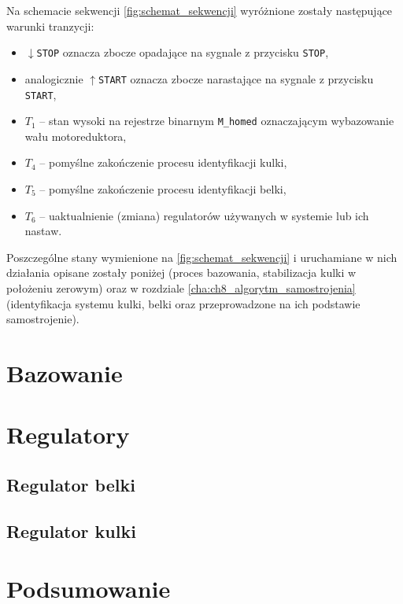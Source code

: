 Na schemacie sekwencji \cref{fig:schemat_sekwencji} wyróżnione zostały następujące warunki tranzycji:
\begin{itemize}
    \item $\downarrow$\texttt{STOP} oznacza zbocze opadające na sygnale z przycisku \texttt{STOP},
    \item analogicznie $\uparrow$\texttt{START} oznacza zbocze narastające na sygnale z przycisku \texttt{START},
    \item $T_1$ -- stan wysoki na rejestrze binarnym \texttt{M\_homed} oznaczającym wybazowanie wału motoreduktora,
    \item $T_4$ -- pomyślne zakończenie procesu identyfikacji kulki,
    \item $T_5$ -- pomyślne zakończenie procesu identyfikacji belki,
    \item $T_6$ -- uaktualnienie (zmiana) regulatorów używanych w systemie lub ich nastaw.
\end{itemize}

Poszczególne stany wymienione na \cref{fig:schemat_sekwencji} i uruchamiane w nich działania opisane zostały poniżej (proces bazowania, stabilizacja kulki w położeniu zerowym) oraz w rozdziale \ref{cha:ch8_algorytm_samostrojenia} (identyfikacja systemu kulki, belki oraz przeprowadzone na ich podstawie samostrojenie).

\section{Bazowanie}
\label{sec:ch7_bazowanie}


\section{Regulatory}
\label{sec:ch7_regulatory}


\subsection{Regulator belki}
\label{subsec:ch7_regulator_belki}


\subsection{Regulator kulki}
\label{subsec:ch7_regulator_kulki}


\section{Podsumowanie}

